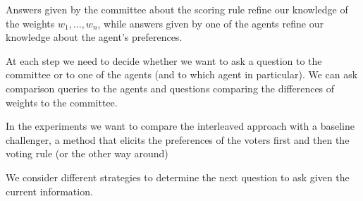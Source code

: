 \documentclass[12pt]{article}
\newcommand{\pprofile}{\textbf{p}}%
\newcommand{\w}{\textbf{w}}%
\begin{document}
Answers given by the committee about the scoring rule refine our knowledge of the weights $w_1,\ldots,w_n$, while
answers given by one of the agents refine our knowledge about the agent's preferences.

At each step we need to decide whether we want to ask a question to the committee or to one of the agents (and to which agent in particular). We can ask comparison queries to the agents and questions comparing the differences of weights to the committee. 

In the experiments we want to compare the interleaved approach with a baseline challenger, a method  that elicits the preferences of the voters first and then the voting rule (or the other way around)


We consider different strategies to determine the next question to ask given the current information.

\end{document}
